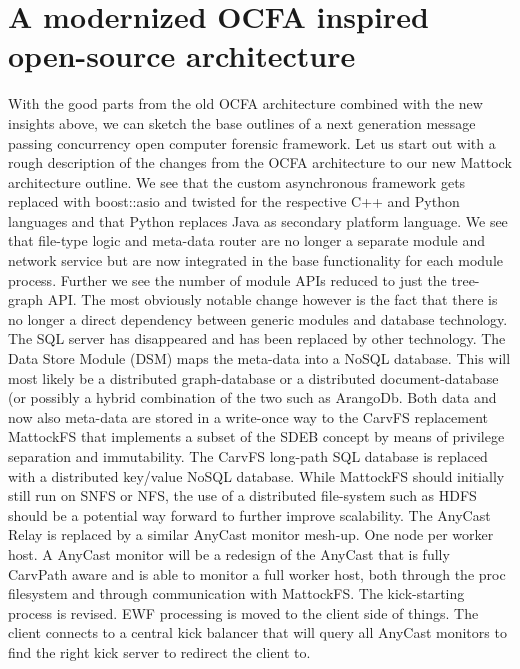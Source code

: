 \section{A modernized OCFA inspired open-source architecture}
With the good parts from the old OCFA architecture combined with the new insights above, we can sketch the base outlines of a next generation message passing concurrency open computer forensic framework. Let us start out with a rough description of the changes from the OCFA architecture to our new Mattock architecture outline. We see that the custom asynchronous framework gets replaced with boost::asio and twisted for the respective C++ and Python languages and that Python replaces Java as secondary platform language. We see that file-type logic and meta-data router are no longer a separate module and network service but are now integrated in the base functionality for each module process. Further we see the number of module APIs reduced to just the tree-graph API. The most obviously notable change however is the fact that there is no longer a direct dependency between generic modules and database technology. The SQL server has disappeared and has been replaced by other technology. The Data Store Module (DSM) maps the meta-data into a NoSQL database. This will most likely be a distributed graph-database or a distributed document-database (or possibly a hybrid combination of the two such as ArangoDb. Both data and now also meta-data are stored in a write-once way to the CarvFS replacement MattockFS that implements a subset of the SDEB concept by means of privilege separation and immutability. The CarvFS long-path SQL database is replaced with a distributed key/value NoSQL database. While MattockFS should initially still run on SNFS or NFS, the use of a distributed file-system such as HDFS should be a potential way forward to further improve scalability. The AnyCast Relay is replaced by a similar AnyCast monitor mesh-up. One node per worker host. A AnyCast monitor will be a redesign of the AnyCast that is fully CarvPath aware and is able to monitor a full worker host, both through the proc filesystem and through communication with MattockFS. The kick-starting process is revised. EWF processing is moved to the client side of things. The client connects to a central kick balancer that will query all AnyCast monitors to find the right kick server to redirect the client to. 
